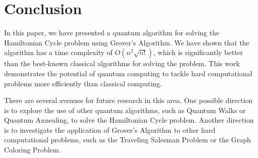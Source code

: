 \section{Conclusion}
\label{sec:conclusion}

In this paper, we have presented a quantum algorithm for solving the Hamiltonian Cycle problem using Grover's Algorithm. We have shown that the algorithm has a time complexity of $O(n^2 \sqrt{n!})$, which is significantly better than the best-known classical algorithms for solving the problem. This work demonstrates the potential of quantum computing to tackle hard computational problems more efficiently than classical computing.

There are several avenues for future research in this area. One possible direction is to explore the use of other quantum algorithms, such as Quantum Walks or Quantum Annealing, to solve the Hamiltonian Cycle problem. Another direction is to investigate the application of Grover's Algorithm to other hard computational problems, such as the Traveling Salesman Problem or the Graph Coloring Problem.

